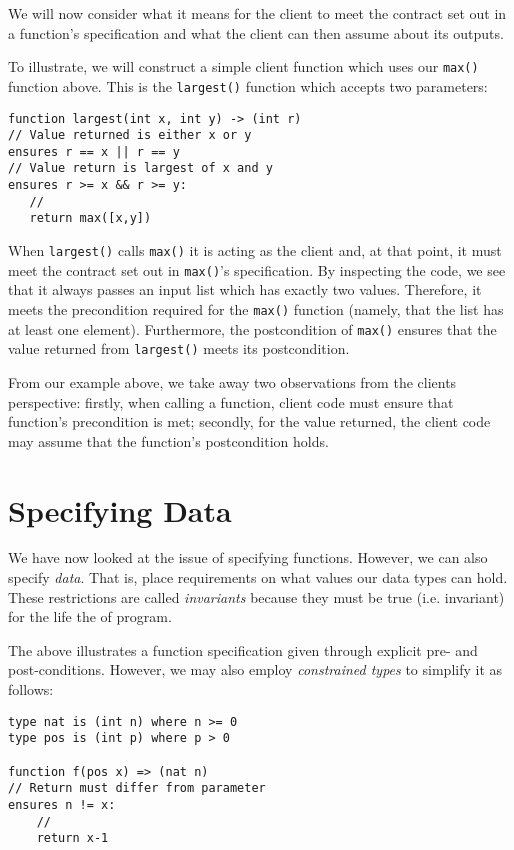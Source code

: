 We will now consider what it means for the client to meet the contract set out in a function's specification and what the client can then assume about its outputs. 

\begin{eg}
To illustrate, we will construct a simple client function which uses our \lstinline{max()} function above.  This is the \lstinline{largest()} function which accepts two parameters:
\begin{lstlisting}
function largest(int x, int y) -> (int r)
// Value returned is either x or y
ensures r == x || r == y
// Value return is largest of x and y
ensures r >= x && r >= y:
   //
   return max([x,y])
\end{lstlisting}
When \lstinline{largest()} calls \lstinline{max()} it is acting as the client and, at that point, it must meet the contract set out in \lstinline{max()}'s specification.  By inspecting the code, we see that it always passes an input list which has exactly two values.  Therefore, it meets the precondition required for the \lstinline{max()} function (namely, that the list has at least one element).  Furthermore, the postcondition of \lstinline{max()} ensures that the value returned from \lstinline{largest()} meets its postcondition.
\end{eg}

From our example above, we take away two observations from the clients perspective:  firstly, when calling a function, client code must ensure that function's precondition is met; secondly, for the value returned, the client code may assume that the function's postcondition holds.

\section{Specifying Data}

We have now looked at the issue of specifying functions.  However, we can also specify {\em data}.  That is, place requirements on what values our data types can hold.  These restrictions are called {\em invariants} because they must be true (i.e. invariant) for the life the of program.  

The above illustrates a function specification given through explicit pre- and
post-conditions.  However, we may also employ {\em constrained types}
to simplify it as follows:

\begin{lstlisting}
type nat is (int n) where n >= 0
type pos is (int p) where p > 0

function f(pos x) => (nat n)
// Return must differ from parameter
ensures n != x:
    //
    return x-1
\end{lstlisting}

